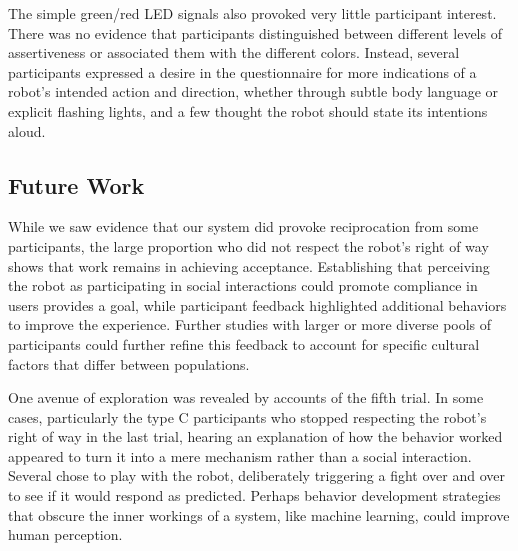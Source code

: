 \documentclass[letterpaper, 10 pt, conference]{ieeeconf}  %
\begin{document}
The simple green/red LED signals also provoked very little participant interest. There was no evidence that participants distinguished between different levels of assertiveness or associated them with the different colors. Instead, several participants expressed a desire in the questionnaire for more indications of a robot’s intended action and direction, whether through subtle body language or explicit flashing lights, and a few thought the robot should state its intentions aloud. 

\subsection{Future Work}
While we saw evidence that our system did provoke reciprocation from some participants, the large proportion who did not respect the robot's right of way shows that work remains in achieving acceptance. Establishing that perceiving the robot as participating in social interactions could promote compliance in users provides a goal, while participant feedback highlighted additional behaviors to improve the experience. Further studies with larger or more diverse pools of participants could further refine this feedback to account for specific cultural factors that differ between populations\cite{bartneck2005ssaisb}.


One avenue of exploration was revealed by accounts of the fifth trial. In some cases, particularly the type C participants who stopped respecting the robot's right of way in the last trial, hearing an explanation of how the behavior worked appeared to turn it into a mere mechanism rather than a social interaction. Several chose to play with the robot, deliberately triggering a fight over and over to see if it would respond as predicted. Perhaps behavior development strategies that obscure the inner workings of a system, like machine learning, could improve human perception.
\end{document}
